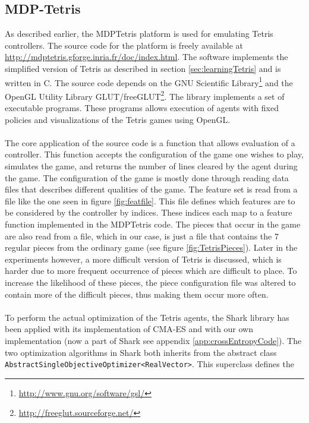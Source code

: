 \subsection{MDP-Tetris \label{sec:MDPTetris}}

As described earlier, the MDPTetris platform is used for emulating Tetris controllers. 
The source code for the 
platform is freely available at \url{http://mdptetris.gforge.inria.fr/doc/index.html}.
The software implements the simplified version of Tetris as described in 
section \ref{sec:learningTetris} and is written in C. The source code depends on
the GNU Scientific Library\footnote{\url{http://www.gnu.org/software/gsl/}} and
the OpenGL Utility 
Library GLUT/freeGLUT\footnote{\url{http://freeglut.sourceforge.net/}}.
The library implements a set of executable programs. These programs 
allows execution of agents with fixed policies and visualizations
of the Tetris games using OpenGL.\\
\\
The core application of the source code is a function that allows evaluation of 
a controller. This function accepts the configuration of the game one wishes to play,
simulates the game, and returns the number of lines cleared by the agent during the game.
The configuration of the game is mostly done through reading data files that describes 
different qualities of the game. The feature set is read from a file
like the one seen in figure \ref{fig:featfile}. This file defines which features are to be 
considered by the controller by indices. These indices each map to a feature function 
implemented in the MDPTetris code. The pieces that occur in the game are also read from a file,
which in our case, is just a file that contains the 7 regular pieces from the ordinary game
(see figure \ref{fig:TetrisPieces}). Later in the experiments however, a more difficult version of Tetris
is discussed, which is harder due to more frequent occurrence of pieces which are difficult to place.
To increase the likelihood of these pieces, the piece configuration file was altered to
contain more of the difficult pieces, thus making them occur more often.\\
\\
To perform the actual optimization of the Tetris agents, the Shark library has been applied
with its implementation of CMA-ES and with our own implementation (now a part of Shark
see appendix \ref{app:crossEntropyCode}). The two optimization algorithms in Shark both 
inherits from the abstract class 
\texttt{\lstinline$AbstractSingleObjectiveOptimizer<RealVector>$}. This superclass defines the
